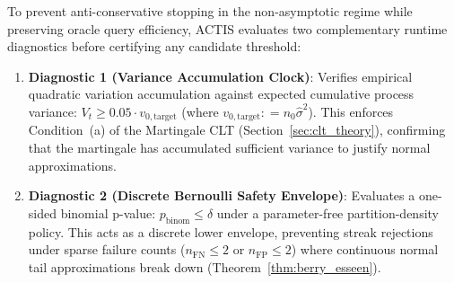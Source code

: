 \documentclass[11pt,a4paper]{article}
\newcommand{\coloneqq}{\mathrel{\mathop:}=}
\begin{document}
To prevent anti-conservative stopping in the non-asymptotic regime while preserving oracle query efficiency, ACTIS evaluates two complementary runtime diagnostics before certifying any candidate threshold:
\begin{enumerate}[leftmargin=*]
    \item \textbf{Diagnostic 1 (Variance Accumulation Clock)}: Verifies empirical quadratic variation accumulation against expected cumulative process variance: $V_t \ge 0.05 \cdot v_{0, \text{target}}$ (where $v_{0, \text{target}} \coloneqq n_0 \hat{\sigma}^2$). This enforces Condition~(a) of the Martingale CLT (Section~\ref{sec:clt_theory}), confirming that the martingale has accumulated sufficient variance to justify normal approximations.
    \item \textbf{Diagnostic 2 (Discrete Bernoulli Safety Envelope)}: Evaluates a one-sided binomial p-value: $p_{\text{binom}} \le \delta$ under a parameter-free partition-density policy. This acts as a discrete lower envelope, preventing streak rejections under sparse failure counts ($n_{\text{FN}} \le 2$ or $n_{\text{FP}} \le 2$) where continuous normal tail approximations break down (Theorem~\ref{thm:berry_esseen}).
\end{enumerate}
\end{document}
